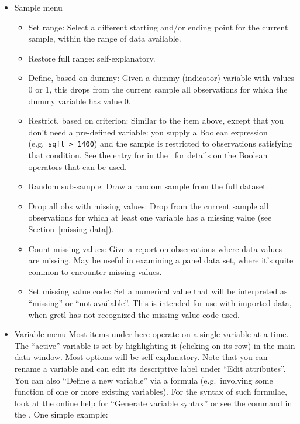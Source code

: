 \begin{itemize}
\item \textsf{Sample menu}
  \begin{itemize}
  \item \textsf{Set range}: Select a different starting and/or ending
    point for the current sample, within the range of data available.
  \item \textsf{Restore full range}: self-explanatory.
  \item \textsf{Define, based on dummy}: Given a dummy (indicator)
    variable with values 0 or 1, this drops from the current sample
    all observations for which the dummy variable has value 0.
  \item \textsf{Restrict, based on criterion}: Similar to the item
    above, except that you don't need a pre-defined variable: you
    supply a Boolean expression (e.g.\ \verb+sqft > 1400+) and the
    sample is restricted to observations satisfying that condition.
    See the entry for  in the \GCR\
    for details on the Boolean operators that can be used.
  \item \textsf{Random sub-sample}: Draw a random sample from the full dataset.
  \item \textsf{Drop all obs with missing values}: Drop from the
    current sample all observations for which at least one variable
    has a missing value (see Section~\ref{missing-data}).
  \item \textsf{Count missing values}: Give a report on observations
    where data values are missing. May be useful in examining a panel
    data set, where it's quite common to encounter missing values.
  \item \textsf{Set missing value code}: Set a numerical value that
    will be interpreted as ``missing'' or ``not available''.  This is
    intended for use with imported data, when gretl has not
    recognized the missing-value code used.
  \end{itemize}

\item \textsf{Variable menu} Most items under here operate on a single
  variable at a time.  The ``active'' variable is set by highlighting
  it (clicking on its row) in the main data window.  Most options will
  be self-explanatory.  Note that you can rename a variable and can
  edit its descriptive label under ``Edit attributes''. You can also
  ``Define a new variable'' via a formula (e.g.\ involving some
  function of one or more existing variables). For the syntax of such
  formulae, look at the online help for ``Generate variable syntax''
  or see the \cmd{genr} command in the \GCR.
  One simple example:
          

\end{itemize}
